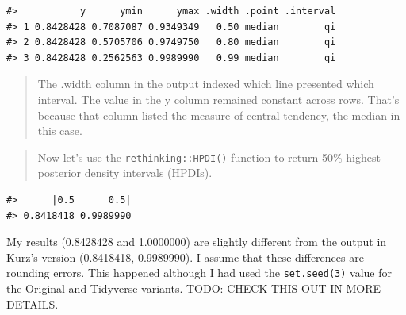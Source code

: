 \documentclass[
  letterpaper,
  DIV=11,
  numbers=noendperiod]{scrreprt}
\newenvironment{Shaded}{\begin{snugshade}}{\end{snugshade}}
\newcommand{\AttributeTok}[1]{\textcolor[rgb]{0.40,0.45,0.13}{#1}}
\newcommand{\CommentTok}[1]{\textcolor[rgb]{0.37,0.37,0.37}{#1}}
\newcommand{\DecValTok}[1]{\textcolor[rgb]{0.68,0.00,0.00}{#1}}
\newcommand{\FunctionTok}[1]{\textcolor[rgb]{0.28,0.35,0.67}{#1}}
\newcommand{\InformationTok}[1]{\textcolor[rgb]{0.37,0.37,0.37}{#1}}
\newcommand{\NormalTok}[1]{\textcolor[rgb]{0.00,0.23,0.31}{#1}}
\newcommand{\SpecialCharTok}[1]{\textcolor[rgb]{0.37,0.37,0.37}{#1}}
\begin{document}
\begin{verbatim}
#>           y      ymin      ymax .width .point .interval
#> 1 0.8428428 0.7087087 0.9349349   0.50 median        qi
#> 2 0.8428428 0.5705706 0.9749750   0.80 median        qi
#> 3 0.8428428 0.2562563 0.9989990   0.99 median        qi
\end{verbatim}

\begin{quote}
The .width column in the output indexed which line presented which
interval. The value in the y column remained constant across rows.
That's because that column listed the measure of central tendency, the
median in this case.
\end{quote}

\begin{quote}
Now let's use the \texttt{rethinking::HPDI()} function to return 50\%
highest posterior density intervals (HPDIs).
\end{quote}

\begin{Shaded}
\end{Shaded}

\begin{verbatim}
#>      |0.5      0.5| 
#> 0.8418418 0.9989990
\end{verbatim}

\begin{tcolorbox}[enhanced jigsaw, colframe=quarto-callout-note-color-frame, colback=white, toprule=.15mm, breakable, arc=.35mm, bottomtitle=1mm, colbacktitle=quarto-callout-note-color!10!white, toptitle=1mm, titlerule=0mm, title=\textcolor{quarto-callout-note-color}{\faInfo}\hspace{0.5em}{Note}, leftrule=.75mm, opacityback=0, rightrule=.15mm, opacitybacktitle=0.6, bottomrule=.15mm, left=2mm, coltitle=black]

My results (0.8428428 and 1.0000000) are slightly different from the
output in Kurz's version (0.8418418, 0.9989990). I assume that these
differences are rounding errors. This happened although I had used the
\texttt{set.seed(3)} value for the Original and Tidyverse variants.
TODO: CHECK THIS OUT IN MORE DETAILS.

\end{tcolorbox}
\end{document}
